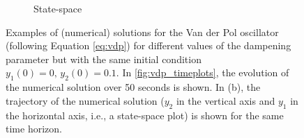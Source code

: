 \begin{figure}[h]
\begin{subfigure}[b]{\textwidth}
	\caption{State-space}\label{fig:vdp_statespace}
    \end{subfigure}
    \caption{Examples of (numerical) solutions for the Van der Pol oscillator (following Equation \eqref{eq:vdp}) for different values of the dampening parameter but with the same initial condition $y_1(0)=0,\,y_2(0)=0.1$. In \ref{fig:vdp_timeplots}, the evolution of the numerical solution over 50 seconds is shown. In (b), the trajectory of the numerical solution ($y_2$ in the vertical axis and $y_1$ in the horizontal axis, i.e., a state-space plot) is shown for the same time horizon.}\label{fig:vdp_example}
\end{figure}

